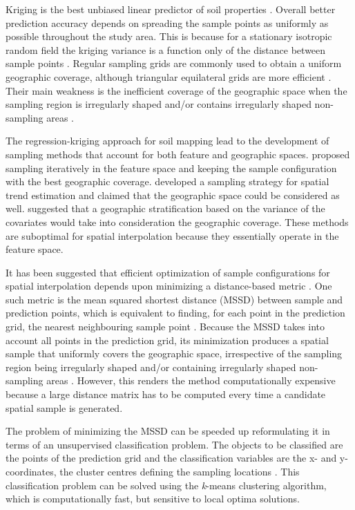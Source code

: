 Kriging is the best unbiased linear predictor of soil properties \cite{LarkEtAl2006}. Overall better prediction
accuracy depends on spreading the sample points as uniformly as possible throughout the study area. This is 
because for a stationary isotropic random field the kriging variance is a function only of the distance between
sample points \cite{Cressie1993}. Regular sampling grids are commonly used to obtain a uniform geographic 
coverage, although triangular equilateral grids are more efficient \cite{WebsterEtAl2007}. Their main weakness 
is the inefficient coverage of the geographic space when the sampling region is irregularly shaped and/or 
contains irregularly shaped non-sampling areas \cite{WalvoortEtAl2010}.

The regression-kriging approach for soil mapping \cite{HenglEtAl2007b} lead to the development of sampling 
methods that account for both feature and geographic spaces. \citet{HenglEtAl2003a} proposed sampling 
iteratively in the feature space and keeping the sample configuration with the best geographic coverage. 
\citet{MinasnyEtAl2006b} developed a sampling strategy for spatial trend estimation and claimed that the 
geographic space could be considered as well. \citet{MinasnyEtAl2007a} suggested that a geographic 
stratification based on the variance of the covariates would take into consideration the geographic coverage. 
These methods are suboptimal for spatial interpolation because they essentially operate in the feature space.

It has been suggested that efficient optimization of sample configurations for spatial interpolation depends 
upon minimizing a distance-based metric \cite{RoyleEtAl1998}. One such metric is the mean squared shortest 
distance (MSSD) between sample and prediction points, which is equivalent to finding, for each point in the 
prediction grid, the nearest neighbouring sample point  \cite{BrusEtAl2006}. Because the MSSD takes into 
account all points in the prediction grid, its minimization produces a spatial sample that uniformly covers the
geographic space, irrespective of the sampling region being irregularly shaped and/or containing 
irregularly shaped non-sampling areas \cite{WalvoortEtAl2010}. However, this renders the method computationally
expensive because a large distance matrix has to be computed every time a candidate spatial sample is 
generated.

The problem of minimizing the MSSD can be speeded up reformulating it in terms of an unsupervised 
classification problem. The objects to be classified are the points of the prediction grid and the 
classification variables are the x- and y-coordinates, the cluster centres defining the sampling locations 
\cite{WalvoortEtAl2010}. This classification problem can be solved using the \textit{k}-means clustering 
algorithm, which is computationally fast, but sensitive to local optima solutions.

